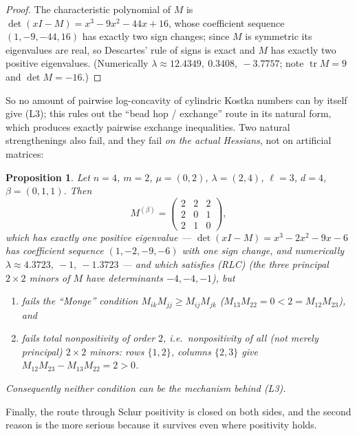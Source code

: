 \documentclass[11pt]{article}
\newtheorem{proposition}[theorem]{Proposition}
\theoremstyle{definition}
\begin{document}
\begin{proof}
The characteristic polynomial of $M$ is
$\det(xI-M)=x^3-9x^2-44x+16$, whose coefficient sequence $(1,-9,-44,16)$ has exactly two sign
changes; since $M$ is symmetric its eigenvalues are real, so Descartes' rule of signs is exact
and $M$ has exactly two positive eigenvalues. (Numerically
$\lambda\approx 12.4349,\ 0.3408,\ -3.7757$; note $\operatorname{tr}M=9$ and
$\det M=-16$.)
\end{proof}

So no amount of pairwise log-concavity of cylindric Kostka numbers can by itself give (L3);
this rules out the ``bead hop / exchange'' route in its natural form, which produces exactly
pairwise exchange inequalities. Two natural strengthenings also fail, and they fail
\emph{on the actual Hessians}, not on artificial matrices:

\begin{proposition}\label{prop:monge}
Let $n=4$, $m=2$, $\mu=(0,2)$, $\lambda=(2,4)$, $\ell=3$, $d=4$, $\beta=(0,1,1)$. Then
\[
  M^{(\beta)}=\begin{pmatrix}2&2&2\\2&0&1\\2&1&0\end{pmatrix},
\]
which has exactly one positive eigenvalue --- $\det(xI-M)=x^3-2x^2-9x-6$ has coefficient
sequence $(1,-2,-9,-6)$ with one sign change, and numerically
$\lambda\approx 4.3723,\ -1,\ -1.3723$ --- and which satisfies \textup{(RLC)}
\emph{(}the three principal $2\times2$ minors of $M$ have determinants $-4,-4,-1$\emph{)},
but
\begin{enumerate}
\item[(i)] fails the ``Monge'' condition $M_{ik}M_{jj}\ge M_{ij}M_{jk}$
\emph{(}$M_{13}M_{22}=0<2=M_{12}M_{23}$\emph{)}, and
\item[(ii)] fails total nonpositivity of order $2$, i.e.\ nonpositivity of all
\emph{(}not merely principal\emph{)} $2\times2$ minors: rows $\{1,2\}$, columns $\{2,3\}$ give
$M_{12}M_{23}-M_{13}M_{22}=2>0$.
\end{enumerate}
Consequently neither condition can be the mechanism behind (L3).
\end{proposition}

Finally, the route through Schur positivity is closed on both sides, and the second reason is
the more serious because it survives even where positivity holds.
\end{document}
